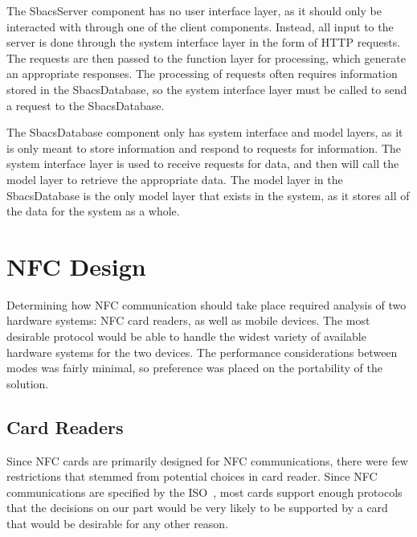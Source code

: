 \documentclass[12pt]{report}
\let\Oldsection\section
\renewcommand{\section}{\FloatBarrier\Oldsection}
\let\Oldsubsection\subsection
\renewcommand{\subsection}{\FloatBarrier\Oldsubsection}
\begin{document}
The SbacsServer component has no user interface layer, as it should only be interacted with through one of the client
components. Instead, all input to the server is done through the system interface layer in the form of HTTP requests.
The requests are then passed to the function layer for processing, which generate an appropriate responses. The
processing of requests often requires information stored in the SbacsDatabase, so the system interface layer must be
called to send a request to the SbacsDatabase.

The SbacsDatabase component only has system interface and model layers, as it is only meant to store information and
respond to requests for information. The system interface layer is used to receive requests for data, and then will
call the model layer to retrieve the appropriate data. The model layer in the SbacsDatabase is the only model layer that exists in the
system, as it stores all of the data for the system as a whole.



\section{NFC Design} \label{nfc-design}

Determining how NFC communication should take place required analysis of two hardware systems: NFC card readers, as well
as mobile devices. The most desirable protocol would be able to handle the widest variety of available hardware systems for
the two devices. The performance considerations between modes was fairly minimal, so preference was placed on the
portability of the solution.


\subsection{Card Readers} \label{card-readers}

Since NFC cards are primarily designed for NFC communications, there were few restrictions that stemmed from potential
choices in card reader. Since NFC communications are specified by the ISO~\autocite{NDEFISO}, most cards support enough 
protocols that the
decisions on our part would be very likely to be supported by a card that would be desirable for any other reason.
\end{document}

